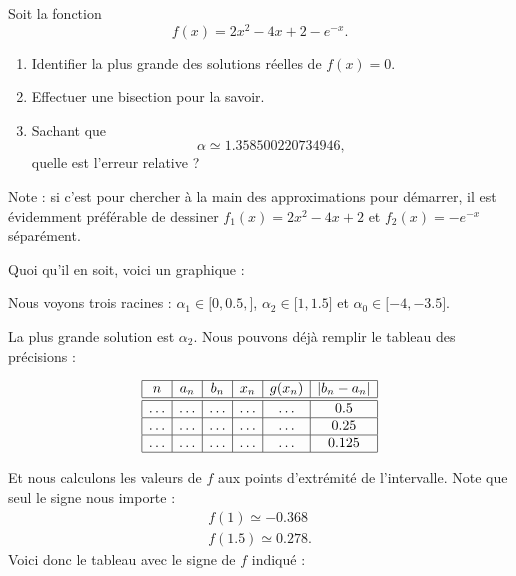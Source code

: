 \begin{example}

	Soit la fonction
	\begin{equation}
		f(x)=2x^2-4x+2-e^{-x}.
	\end{equation}

	\begin{enumerate}
		\item
		      Identifier la plus grande des solutions réelles de \( f(x)=0\).
		\item
		      Effectuer une bisection pour la savoir.
		\item
		      Sachant que
		      \begin{equation}
			      \alpha\simeq 1.358500220734946,
		      \end{equation}
		      quelle est l'erreur relative ?
	\end{enumerate}

	Note : si c'est pour chercher à la main des approximations pour démarrer, il est évidemment préférable de dessiner \( f_1(x)=2x^2-4x+2\) et \( f_2(x)=- e^{-x}\) séparément.

	Quoi qu'il en soit, voici un graphique :

	\begin{center}
		
	\end{center}

	Nous voyons trois racines : \( \alpha_1\in\mathopen[ 0,0.5 ,  \mathclose]\), \( \alpha_2\in\mathopen[ 1, 1.5 \mathclose]\) et \( \alpha_0\in\mathopen[ -4 , -3.5 \mathclose]\).

	La plus grande solution est \( \alpha_2\). Nous pouvons déjà remplir le tableau des précisions :

	\begin{equation*}
		\begin{array}[]{|c|c|c|c|c|c|}
			\hline
			n      & a_n    & b_n    & x_n    & g(x_n) & | b_n-a_n | \\
			\hline\hline
			\ldots & \ldots & \ldots & \ldots & \ldots & 0.5         \\
			\hline
			\ldots & \ldots & \ldots & \ldots & \ldots & 0.25        \\
			\hline
			\ldots & \ldots & \ldots & \ldots & \ldots & 0.125       \\
			\hline
		\end{array}
	\end{equation*}

	Et nous calculons les valeurs de \( f\) aux points d'extrémité de l'intervalle. Note que seul le signe nous importe :
	\begin{subequations}
		\begin{align}
			f(1)\simeq -0.368 \\
			f(1.5)\simeq 0.278.
		\end{align}
	\end{subequations}
	Voici donc le tableau avec le signe de \( f\) indiqué :


\end{example}
